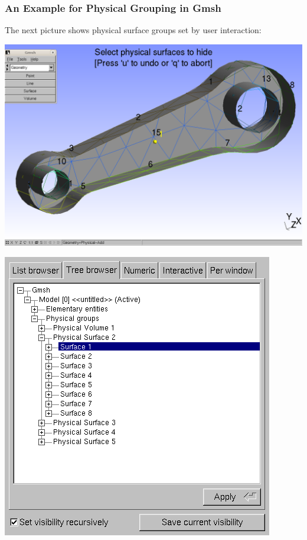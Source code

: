 \begin{frame}
  \frametitle<presentation>{An Example for Physical Grouping in Gmsh}
  The next picture shows physical surface groups set by user interaction:

  \begin{minipage}{\linewidth}
    \begin{minipage}{0.64\linewidth}
      \begin{center}
        \includegraphics[width=\textwidth]{./EPS/crank/crank_surfgroups1}
      \end{center}
    \end{minipage}
    \hfill
    \begin{minipage}{0.35\linewidth}
      \begin{center}
        \includegraphics[width=\textwidth]{./EPS/crank/crank_surfgroups2}
      \end{center}
    \end{minipage}
  \end{minipage}
\end{frame}

